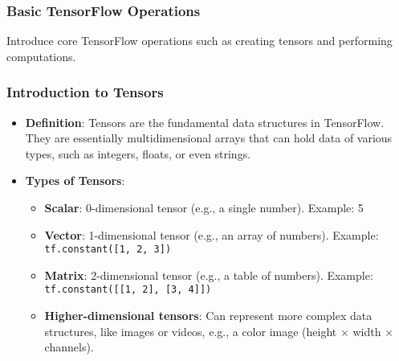 \documentclass[aspectratio=169]{beamer}
\begin{document}
\begin{frame}
    \frametitle{Basic TensorFlow Operations}
    Introduce core TensorFlow operations such as creating tensors and performing computations.
\end{frame}

\begin{frame}
    \frametitle{Introduction to Tensors}
    \begin{itemize}
        \item \textbf{Definition}: Tensors are the fundamental data structures in TensorFlow. 
        They are essentially multidimensional arrays that can hold data of various types, 
        such as integers, floats, or even strings.
        \item \textbf{Types of Tensors}:
        \begin{itemize}
            \item \textbf{Scalar}: 0-dimensional tensor (e.g., a single number). 
                  Example: 5
            \item \textbf{Vector}: 1-dimensional tensor (e.g., an array of numbers).
                  Example: \texttt{tf.constant([1, 2, 3])}
            \item \textbf{Matrix}: 2-dimensional tensor (e.g., a table of numbers).
                  Example: \texttt{tf.constant([[1, 2], [3, 4]])}
            \item \textbf{Higher-dimensional tensors}: Can represent more complex data structures, 
                  like images or videos, e.g., a color image (height $\times$ width $\times$ channels).
        \end{itemize}
    \end{itemize}
\end{frame}
\end{document}
